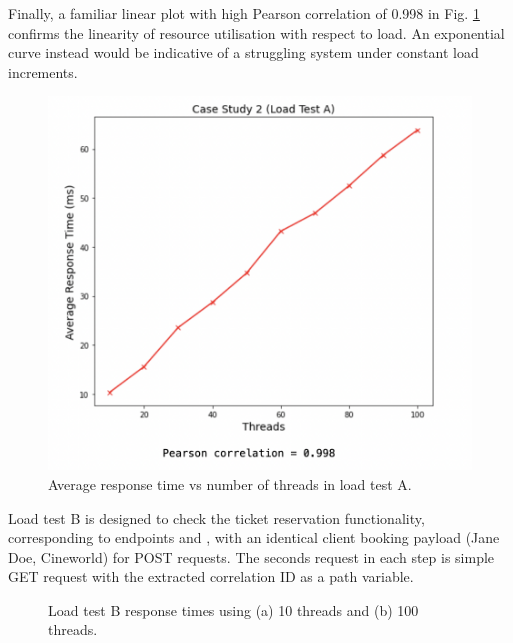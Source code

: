 Finally, a familiar linear plot with high Pearson correlation of 0.998 in Fig. \ref{fig:cs02-lta-4} confirms the linearity of resource utilisation with respect to load. An exponential curve instead would be indicative of a struggling system under constant load increments.

\begin{figure}[H]
  \centering
  \includegraphics[width=0.55\linewidth]{./assets/images/case-studies/cs02-lta-4.png}
  \caption{Average response time vs number of threads in load test A.}
  \label{fig:cs02-lta-4}
\end{figure}

Load test B is designed to check the ticket reservation functionality, corresponding to endpoints  and , with an identical client booking payload (Jane Doe, Cineworld) for POST requests. The seconds request in each step is simple GET request with the extracted correlation ID as a path variable.

\begin{figure}[H]
  \centering
  \caption{Load test B response times using (a) 10 threads and (b) 100 threads.}
  \label{fig:cs02-ltb-12}
\end{figure}

